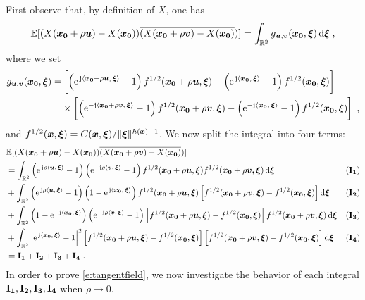 \documentclass{elsarticle}
\begin{document}
First observe that, by definition of $X$, one has
\begin{equation}
\mathbb{E}[(X(\vect{x_0}+\rho \vect{u})-X(\vect{x_0}))\overline{(X(\vect{x_0}+\rho \vect{v})-X(\vect{x_0})})]=\int_{\mathbb{R}^2}g_{\vect{u},\vect{v}}(\vect{x_0},\vect{\xi})\dif \vect{\xi}\;,
\end{equation}
where we set
\begin{align*}
g_{\bm{u},\bm{v}}(\bm{x_0},\bm{\xi})=&\left[\left(\mathrm{e}^{\, \mathrm{j} \left \langle \bm{x_0}+\rho \bm{u},\, \bm{\xi}\right \rangle}-1\right)f^{1/2}(\bm{x_0}+\rho \bm{u},\bm{\xi})-\left(\mathrm{e}^{\, \mathrm{j} \left \langle \bm{x_0},\, \bm{\xi}\right \rangle}-1\right)f^{1/2}(\bm{x_0},\bm{\xi})\right]\\
&\times\left[\left(\mathrm{e}^{-\mathrm{j} \left \langle \bm{x_0}+\rho \bm{v},\, \bm{\xi}\right \rangle}-1\right)f^{1/2}(\bm{x_0}+\rho \bm{v},\bm{\xi})-\left(\mathrm{e}^{-\mathrm{j} \left \langle \bm{x_0},\, \bm{\xi}\right \rangle}-1\right)f^{1/2}(\bm{x_0},\bm{\xi})\right]\;,
\end{align*}
and $f^{1/2}(\bm{x},\bm{\xi})=C(\bm{x},\bm{\xi})/\|\bm{\xi}\|^{h(\bm{x})+1}$.
We now split the integral into four terms:
\begin{align*}
&\mathbb{E}[(X(\vect{x_0}+\rho \vect{u})-X(\vect{x_0}))\overline{(X(\vect{x_0}+\rho \vect{v})-X(\vect{x_0})})]\\
&=\int_{\mathbb{R}^2}\left(\expj{\rho \ip{\vect{u}}{\vect{\xi}}}-1\right)\left(\eu^{-\jj \rho \ip{\vect{v}}{\vect{\xi}}}-1\right)f^{1/2}(\vect{x_0}+\rho \vect{u},\vect{\xi})f^{1/2}(\vect{x_0}+\rho \vect{v,}\vect{\xi})\dif \vect{\xi}&(\mat{I_1})\\
&+\int_{\mathbb{R}^2}\left(\expj{\rho \ip{\vect{u}}{\vect{\xi}}}-1\right)\left(1-\expj{\ip{\vect{x_0}}{\vect{\xi}}}\right)f^{1/2}(\vect{x_0}+\rho \vect{u},\vect{\xi})\left[f^{1/2}(\vect{x_0}+\rho \vect{v},\vect{\xi})-f^{1/2}(\vect{x_0},\vect{\xi})\right]\dif \vect{\xi}&(\mat{I_2})\\
&+\int_{\mathbb{R}^2}\left(1-\eu^{-\jj \ip{\vect{x_0}}{\vect{\xi}}}\right)\left(\eu^{-\jj \rho \ip{\vect{v}}{\vect{\xi}}}-1\right)\left[f^{1/2}(\vect{x_0}+\rho \vect{u},\vect{\xi})-f^{1/2}(\vect{x_0},\vect{\xi})\right]f^{1/2}(\vect{x_0}+\rho \vect{v},\vect{\xi})\dif \vect{\xi}&(\mat{I_3})\\
&+\int_{\mathbb{R}^2}\left|\expj{\ip{\vect{x_0}}{\vect{\xi}}}-1\right|^2\left[f^{1/2}(\vect{x_0}+\rho \vect{u},\vect{\xi})-f^{1/2}(\vect{x_0},\vect{\xi})\right]\left[f^{1/2}(\vect{x_0}+\rho \vect{v},\vect{\xi})-f^{1/2}(\vect{x_0},\vect{\xi})\right]\dif \vect{\xi} &(\mat{I_4})\\
&=\mat{I_1}+\mat{I_2}+\mat{I_3}+\mat{I_4}~.
\end{align*}
In order to prove \eqref{e:tangentfield}, we now  investigate the behavior of each integral $\mathbf{I_1},\mathbf{I_2},\mathbf{I_3},\mathbf{I_4}$ when $\rho \to 0$.\\
\end{document}
